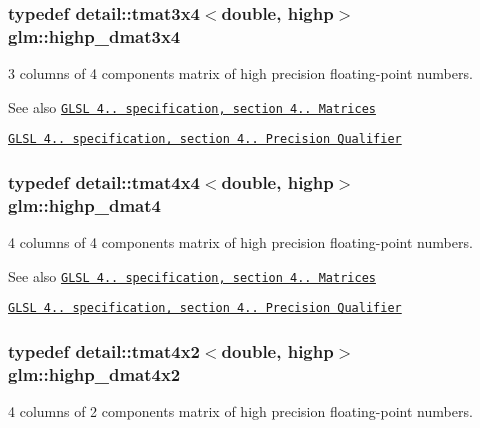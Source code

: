 \subsubsection[{\texorpdfstring{highp\+\_\+dmat3x4}{highp_dmat3x4}}]{\setlength{\rightskip}{0pt plus 5cm}typedef detail\+::tmat3x4$<$double, highp$>$ {\bf glm\+::highp\+\_\+dmat3x4}}\hypertarget{group__core__precision_gaff199c8d04a8edb92ed43283e8694c59}{}\label{group__core__precision_gaff199c8d04a8edb92ed43283e8694c59}
3 columns of 4 components matrix of high precision floating-\/point numbers.

\begin{DoxySeeAlso}{See also}
\href{http://www.opengl.org/registry/doc/GLSLangSpec.4.20.8.pdf}{\tt G\+L\+SL 4.. specification, section 4.. Matrices} 

\href{http://www.opengl.org/registry/doc/GLSLangSpec.4.20.8.pdf}{\tt G\+L\+SL 4.. specification, section 4.. Precision Qualifier} 
\end{DoxySeeAlso}
\subsubsection[{\texorpdfstring{highp\+\_\+dmat4}{highp_dmat4}}]{\setlength{\rightskip}{0pt plus 5cm}typedef detail\+::tmat4x4$<$double, highp$>$ {\bf glm\+::highp\+\_\+dmat4}}\hypertarget{group__core__precision_ga9a5d95e476d451d28d3939ac7f124baf}{}\label{group__core__precision_ga9a5d95e476d451d28d3939ac7f124baf}
4 columns of 4 components matrix of high precision floating-\/point numbers.

\begin{DoxySeeAlso}{See also}
\href{http://www.opengl.org/registry/doc/GLSLangSpec.4.20.8.pdf}{\tt G\+L\+SL 4.. specification, section 4.. Matrices} 

\href{http://www.opengl.org/registry/doc/GLSLangSpec.4.20.8.pdf}{\tt G\+L\+SL 4.. specification, section 4.. Precision Qualifier} 
\end{DoxySeeAlso}
\subsubsection[{\texorpdfstring{highp\+\_\+dmat4x2}{highp_dmat4x2}}]{\setlength{\rightskip}{0pt plus 5cm}typedef detail\+::tmat4x2$<$double, highp$>$ {\bf glm\+::highp\+\_\+dmat4x2}}\hypertarget{group__core__precision_gaa4fb1ed350a6cd053abb9b093d13ce0d}{}\label{group__core__precision_gaa4fb1ed350a6cd053abb9b093d13ce0d}
4 columns of 2 components matrix of high precision floating-\/point numbers.

